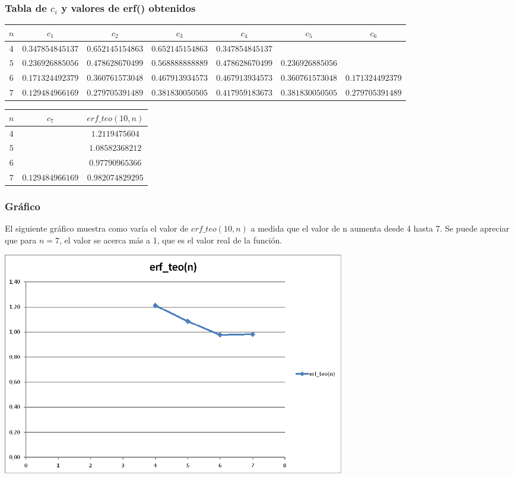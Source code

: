\documentclass[letter, 10pt]{article}
\begin{document}
\newpage

\subsubsection{Tabla de $c_i$ y valores de erf() obtenidos}

\begin{tabular}{|c|c|c|c|c|c|c|}
		\hline
		$n$ & $c_1$ & $c_2$ & $c_3$ & $c_4$ & $c_5$ & $c_6$ \\
		\hline \hline
		$ 4 $ & $ 0.347854845137 $ & $ 0.652145154863 $ & $ 0.652145154863 $ & $ 0.347854845137 $ & $ $ & $ $ \\ 
		$ 5 $ & $ 0.236926885056 $ & $ 0.478628670499 $ & $ 0.568888888889 $ & $ 0.478628670499 $ & $ 0.236926885056 $ & $ $ \\ 
		$ 6 $ & $ 0.171324492379 $ & $ 0.360761573048 $ & $ 0.467913934573 $ & $ 0.467913934573 $ & $ 0.360761573048 $ & $ 0.171324492379 $ \\ 
		$ 7 $ & $ 0.129484966169 $ & $ 0.279705391489 $ & $ 0.381830050505 $ & $ 0.417959183673 $ & $ 0.381830050505 $ & $ 0.279705391489 $ \\
		\hline
\end{tabular}

\begin{tabular}{|c|c|c|}
		\hline
		$n$ & $c_7$ & $erf\_teo(10, n)$ \\
		\hline \hline
		$ 4 $ & $ $ & $ 1.2119475604 $ \\ 
		$ 5 $ & $ $ & $ 1.08582368212 $ \\  
		$ 6 $ & $ $ & $ 0.97790965366 $ \\
		$ 7 $ & $ 0.129484966169 $ & $ 0.982074829295 $ \\
		\hline
\end{tabular}

\subsubsection{Gr\'afico} El siguiente gr\'afico muestra como var\'ia el valor de $erf\_teo(10, n)$ a medida que el valor de n aumenta desde 4 hasta 7. Se puede apreciar que para $n = 7$, el valor se acerca m\'as a 1, que es el valor real de la funci\'on.

\begin{center}
\includegraphics[width=15cm]{grafico.png}
\end{center}
\end{document}
